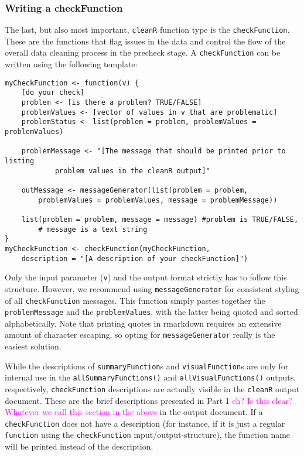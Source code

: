 \documentclass[article]{jss}
\newcommand{\hl}[1]{\textcolor{magenta}{#1}}
\newcommand{\R}[1]{\texttt{#1}}
\begin{document}
\subsubsection{Writing a checkFunction}
The last, but also most important, \R{cleanR} function type is the \R{checkFunction}. These are the functions that flag issues in the data and control the flow of the overall data cleaning process in the precheck stage. A \R{checkFunction} can be written using the following template:
\begin{Verbatim}
myCheckFunction <- function(v) {
	[do your check]
	problem <- [is there a problem? TRUE/FALSE]
	problemValues <- [vector of values in v that are problematic]
	problemStatus <- list(problem = problem, problemValues = problemValues)
	
	problemMessage <- "[The message that should be printed prior to listing 
			problem values in the cleanR output]"
	
	outMessage <- messageGenerator(list(problem = problem, 
		problemValues = problemValues, message = problemMessage))
	
	list(problem = problem, message = message) #problem is TRUE/FALSE,
		# message is a text string 
}
myCheckFunction <- checkFunction(myCheckFunction, 
	description = "[A description of your checkFunction]")
\end{Verbatim}
Only the input parameter (\R{v}) and the output format strictly has to follow this structure. However, we recommend using \R{messageGenerator} for consistent styling of all \R{checkFunction} messages. This function simply pastes together the \R{problemMessage} and the \R{problemValues}, with the latter being quoted and sorted alphabetically. Note that printing quotes in rmarkdown requires an extensive amount of character escaping, so opting for \R{messageGenerator} really is the easiest solution.

While the descriptions of \R{summaryFunction}s and \R{visualFunction}s are only for internal use in the \R{allSummaryFunctions()} and \R{allVisualFunctions()} outputs, respectively, \R{checkFunction} descriptions are actually visible in the \R{cleanR} output document. These are the brief descriptions presented in Part 1 \hl{eh? Is this clear? Whatever we call this section in the above} in the output document. If a \R{checkFunction} does not have a description (for instance, if it is just a regular \R{function} using the \R{checkFunction} input/output-structure), the function name will be printed instead of the description. 
\end{document}
